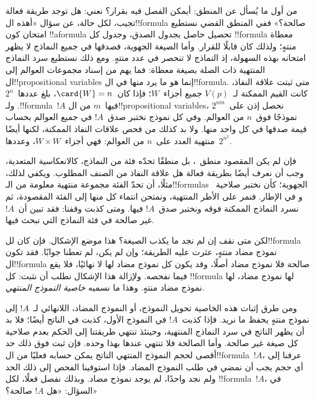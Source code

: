 \documentclass[../../../include/open-logic-section]{subfiles}
\begin{document}


من أول ما يُسأل عن المنطق: أيمكن الفصل فيه بقرار؟ نعني:
هل توجد طريقة فعالة تجيب، لكل حالة، عن سؤال «أهذه
ال!!{formula} صالحة؟» ففي المنطق القضي نستطيع امتحان
كون !!a{formula} تحصيل حاصل بجدول الصدق، وجدول كل
!!{formula} معطاة منتهٍ؛ ولذلك كان قابلًا للقرار.
وأما الصيغة الجهوية، فصدقها في جميع النماذج لا يظهر
امتحانه بهذه السهولة، إذ النماذج لا تنحصر في عدد منتهٍ.
ومع ذلك نستطيع سرد النماذج المنتهية ذات الصلة بصيغة معطاة:
فما يهم من إسناد مجموعات العوالم إلى ال!!{propositional variable}s
إنما هو ما يرد منها في ال!!{formula}. متى ثبتت علاقة
النفاذ، كانت القيم الممكنة لـ~$V(p)$ جميع أجزاء~$W$؛
فإذا كان~$\card{W}=n$، بلغ عددها~$2^n$. ولـ!!{formula}~$!A$
فيها~$m$ من ال!!{propositional
  variable}s، نحصل إذن على~$2^{nm}$ نموذجًا فوق~$n$
من العوالم. وفي كل نموذج نختبر صدق~$!A$ في جميع
العوالم بحساب قيمة صدقها في كل واحد منها. ولا بد كذلك
من فحص علاقات النفاذ الممكنة، لكنها أيضًا منتهية العدد
على~$n$ من العوالم: فهي أجزاء~$W \times W$،
وعددها~$2^{n^2}$.

فإن لم يكن المقصود منطق~، بل منطقًا تحدّه
فئة من النماذج، كالانعكاسية المتعدية، وجب أن نعرف أيضًا
بطريقة فعالة هل علاقة النفاذ من الصنف المطلوب. ويكفي
لذلك، مثلًا، أن تحدّ الفئة مجموعة منتهية معلومة من
الـ!!{formula}s الجهوية؛ كأن نختبر صلاحية~
و في الإطار.
فنمر على الأطر المنتهية، ونمتحن انتماء كل منها إلى
الفئة المقصودة، ثم نسرد النماذج الممكنة فوقه ونختبر
صدق~$!A$ فيها. ومتى كذبت وقفنا: فقد تبين أن~$!A$
غير صالحة في فئة النماذج التي نبحث فيها.

لكن متى نقف إن لم نجد ما يكذب الصيغة؟ هذا موضع
الإشكال. فإن كان لل!!{formula} نموذج مضاد منتهٍ،
عثرت عليه الطريقة؛ وإن لم يكن، لم تعطنا جوابًا.
فقد تكون ال!!{formula} صالحة فلا نموذج مضاد أصلًا،
وقد يكون كل نموذج مضاد لها لا نهائيًا، فلا يقع
فيما نفحصه. ولإزالة هذا الإشكال نطلب أن نثبت:
كل !!{formula} لها نموذج مضاد، لها نموذج مضاد منتهٍ.
وهذا ما نسميه \emph{خاصية النموذج المنتهي}.

ومن طرق إثبات هذه الخاصية تحويل النموذج، أو النموذج
المضاد، اللانهائي لـ~$!A$ إلى نموذج منتهٍ يحفظ ما
نريد. فإذا كذبت~$!A$ في النموذج الأول، كذبت في
الناتج أيضًا؛ فلا بد أن يظهر الناتج في سرد النماذج
المنتهية، وحينئذ تنتهي طريقتنا إلى الحكم بعدم صلاحية
كل صيغة غير صالحة. وأما الصالحة فلا تنتهي عندها
بهذا وحده. فإن ثبت فوق ذلك حد أقصى لحجم النموذج
المنتهي الناتج يمكن حسابه فعليًا من ال!!{formula}~$!A$،
عرفنا إلى أي حجم يجب أن نمضي في طلب النموذج المضاد.
فإذا استوفينا الفحص إلى ذلك الحد ولم نجد واحدًا،
لم يوجد نموذج مضاد. وبذلك نفصل فعلًا، لكل
!!{formula}~$!A$، في السؤال: «هل $!A$ صالحة؟»
\end{document}
